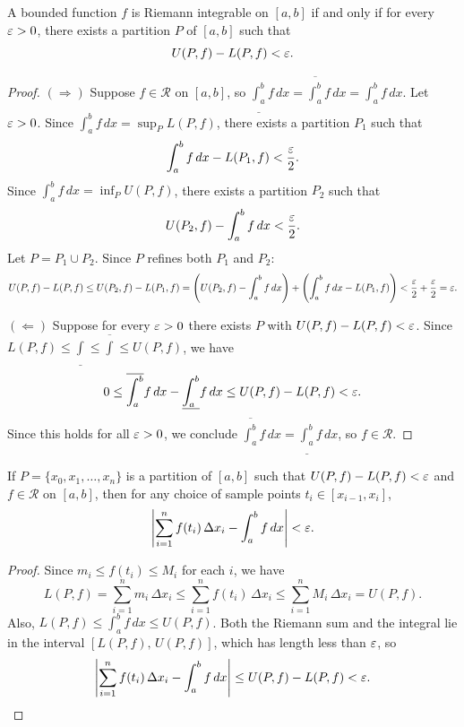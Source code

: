 \documentclass[../master/master.tex]{subfiles}
\begin{document}
\begin{theorem}
A bounded function $f$ is Riemann integrable on $[a,b]$ if and only if for every $\varepsilon > 0$, there exists a partition $P$ of $[a,b]$ such that
\[
U(P, f) - L(P, f) < \varepsilon.
\]
\end{theorem}

\begin{proof}
$(\Rightarrow)$ Suppose $f \in \mathscr{R}$ on $[a,b]$, so $\underline{\int_a^b} f\,dx = \overline{\int_a^b} f\,dx = \int_a^b f\,dx$. Let $\varepsilon > 0$. Since $\int_a^b f\,dx = \sup_P L(P,f)$, there exists a partition $P_1$ such that
\[
\int_a^b f\,dx - L(P_1, f) < \frac{\varepsilon}{2}.
\]
Since $\int_a^b f\,dx = \inf_P U(P,f)$, there exists a partition $P_2$ such that
\[
U(P_2, f) - \int_a^b f\,dx < \frac{\varepsilon}{2}.
\]
Let $P = P_1 \cup P_2$. Since $P$ refines both $P_1$ and $P_2$:
\[
U(P, f) - L(P, f) \leq U(P_2, f) - L(P_1, f) = \left(U(P_2, f) - \int_a^b f\,dx\right) + \left(\int_a^b f\,dx - L(P_1, f)\right) < \frac{\varepsilon}{2} + \frac{\varepsilon}{2} = \varepsilon.
\]

$(\Leftarrow)$ Suppose for every $\varepsilon > 0$ there exists $P$ with $U(P,f) - L(P,f) < \varepsilon$. Since $L(P,f) \leq \underline{\int} \leq \overline{\int} \leq U(P,f)$, we have
\[
0 \leq \overline{\int_a^b} f\,dx - \underline{\int_a^b} f\,dx \leq U(P,f) - L(P,f) < \varepsilon.
\]
Since this holds for all $\varepsilon > 0$, we conclude $\overline{\int_a^b} f\,dx = \underline{\int_a^b} f\,dx$, so $f \in \mathscr{R}$.
\end{proof}

\begin{theorem}
If $P = \{x_0, x_1, \dots, x_n\}$ is a partition of $[a,b]$ such that $U(P,f) - L(P,f) < \varepsilon$ and $f \in \mathscr{R}$ on $[a,b]$, then for any choice of sample points $t_i \in [x_{i-1}, x_i]$,
\[
\left| \sum_{i=1}^{n} f(t_i) \, \Delta x_i - \int_a^b f \, dx \right| < \varepsilon.
\]
\end{theorem}

\begin{proof}
Since $m_i \leq f(t_i) \leq M_i$ for each $i$, we have
\[
L(P, f) = \sum_{i=1}^{n} m_i \, \Delta x_i \leq \sum_{i=1}^{n} f(t_i) \, \Delta x_i \leq \sum_{i=1}^{n} M_i \, \Delta x_i = U(P, f).
\]
Also, $L(P, f) \leq \int_a^b f\,dx \leq U(P, f)$. Both the Riemann sum and the integral lie in the interval $[L(P,f),\, U(P,f)]$, which has length less than $\varepsilon$, so
\[
\left| \sum_{i=1}^{n} f(t_i) \, \Delta x_i - \int_a^b f \, dx \right| \leq U(P,f) - L(P,f) < \varepsilon. \qedhere
\]
\end{proof}
\end{document}
